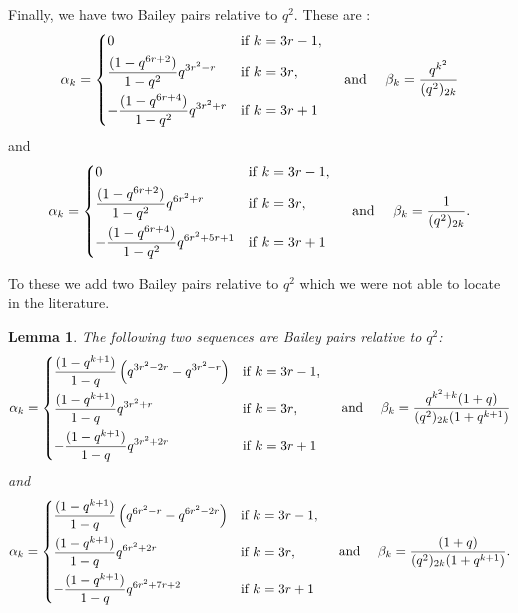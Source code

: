 \documentclass[11pt,reqno]{amsart}
\newtheorem{lemma}[theorem]{Lemma}
\theoremstyle{definition}
\numberwithin{equation}{section}
\renewcommand{\=}{\;=\;}
\begin{document}
Finally, we have two Bailey pairs relative to $q^2$.   These are \cite[Eq. (2.34), $e \to 0$ and $e \to \infty$]{Si-Mc-Zi}:
\begin{equation} \label{BP7}
	\alpha_k = 
	\begin{dcases}
	        0 &\text{if $k=3r-1$}, \\	
		\frac{(1-q^{6r+2})}{1-q^2}q^{3r^2-r} & \text{if $k=3r$}, \\
		-\frac{(1-q^{6r+4})}{1-q^2}q^{3r^2+r} & \text{if $k=3r+1$} 
	\end{dcases}
\ \ \ \ \text{and} \ \ \ \ 
	\beta_k = \frac{q^{k^2}}{(q^2)_{2k}}
\end{equation}
and
\begin{equation} \label{BP8} 
	\alpha_k = 
	\begin{dcases}
	         0 &\text{if $k=3r-1$}, \\
		\frac{(1-q^{6r+2})}{1-q^2}q^{6r^2+r} & \text{if $k=3r$}, \\
		-\frac{(1-q^{6r+4})}{1-q^2}q^{6r^2+5r+1} & \text{if $k=3r+1$}
	\end{dcases}
\ \ \ \ \text{and} \ \ \ \
	\beta_k = \frac{1}{(q^2)_{2k}}.
\end{equation}

To these we add two Bailey pairs relative to $q^2$ which we were not able to locate in the literature.
\begin{lemma}
The following two sequences are Bailey pairs relative to $q^2$:
	\begin{equation} \label{BP9}
		\alpha_k = 
		\begin{dcases}
			\frac{(1-q^{k+1})}{1-q}\left(q^{3r^2-2r} - q^{3r^2-r}\right) & \text{if $k=3r-1$}, \\
			\frac{(1-q^{k+1})}{1-q}q^{3r^2+r} & \text{if $k=3r$}, \\
			-\frac{(1-q^{k+1})}{1-q}q^{3r^2+2r} &\text{if $k=3r+1$}
		\end{dcases}
		\ \ \ \ \text{and} \ \ \ \ \beta_k = \frac{q^{k^2+k}(1+q)}{(q^2)_{2k}(1+q^{k+1})}
	\end{equation}
and	
	\begin{equation} \label{BP10}
		\alpha_k = 
		\begin{dcases}
			\frac{(1-q^{k+1})}{1-q}\left(q^{6r^2-r} - q^{6r^2-2r}\right) & \text{if $k=3r-1$}, \\
			\frac{(1-q^{k+1})}{1-q}q^{6r^2+2r} & \text{if $k=3r$}, \\
			-\frac{(1-q^{k+1})}{1-q}q^{6r^2+7r+2} &\text{if $k=3r+1$}
		\end{dcases}
		\ \ \ \ \text{and} \ \ \ \ \beta_k = \frac{(1+q)}{(q^2)_{2k}(1+q^{k+1})}.
	\end{equation}  
	
\end{lemma}
\end{document}

